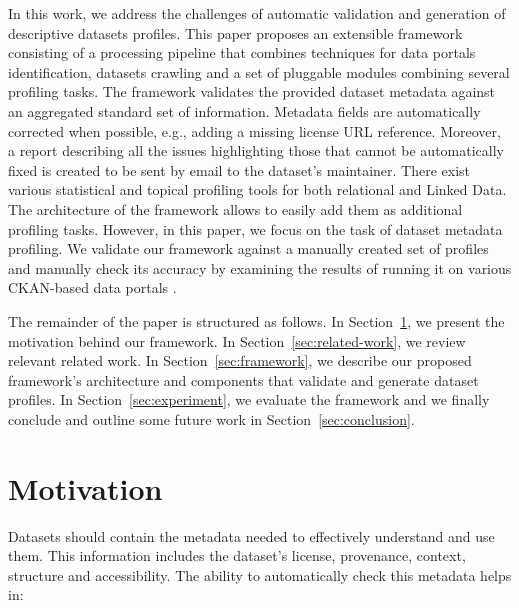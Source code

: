 \documentclass[runningheads,a4paper]{llncs}
\begin{document}
In this work, we address the challenges of automatic validation and generation of descriptive datasets profiles. This paper proposes an extensible framework consisting of a processing pipeline that combines techniques for data portals identification, datasets crawling and a set of pluggable modules combining several profiling tasks. The framework validates the provided dataset metadata against an aggregated standard set of information. Metadata fields are automatically corrected when possible, e.g., adding a missing license URL reference. Moreover, a report describing all the issues highlighting those that cannot be automatically fixed is created to be sent by email to the dataset's maintainer. There exist various statistical and topical profiling tools for both relational and Linked Data. The architecture of the framework allows to easily add them as additional profiling tasks. However, in this paper, we focus on the task of dataset metadata profiling. We validate our framework against a manually created set of profiles and manually check its accuracy by examining the results of running it on various CKAN-based data portals .


The remainder of the paper is structured as follows. In Section~\ref{sec:motivation}, we present the motivation behind our framework. In Section~\ref{sec:related-work}, we review relevant related work. In Section~\ref{sec:framework}, we describe our proposed framework's architecture and components that validate and generate dataset profiles. In Section~\ref{sec:experiment}, we evaluate the framework and we finally conclude and outline some future work in Section~\ref{sec:conclusion}.

\section{Motivation}
\label{sec:motivation}

Datasets should contain the metadata needed to effectively understand and use them. This information includes the dataset's license, provenance, context, structure and accessibility. The ability to automatically check this metadata helps in:
\end{document}
